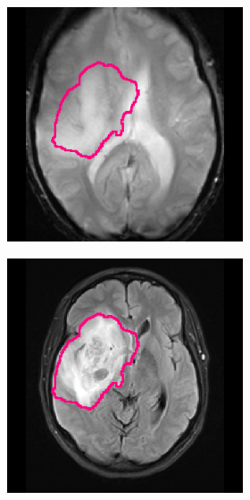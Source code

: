 \begin{subappendices}
\begin{figure}[htbp]
\begin{subfigure}[b]{0.8\textwidth}
\begin{subfigure}[b]{0.215\textwidth}
        \end{subfigure}
        \hfill
        \begin{subfigure}[b]{0.215\textwidth}
        \includegraphics[width=\textwidth, clip, trim=2.5cm 0.5cm 2.5cm 0.5cm]{Figures/Random_segs/T2_TCGA-14-3477.png}
        \end{subfigure}
        \hfill
        \begin{subfigure}[b]{0.215\textwidth}
        \includegraphics[width=\textwidth, clip, trim=2.5cm 0.5cm 2.5cm 0.5cm]{Figures/Random_segs/FLAIR_TCGA-14-3477.png}

\end{subfigure}
\end{subfigure}
\end{figure}
\end{subappendices}
